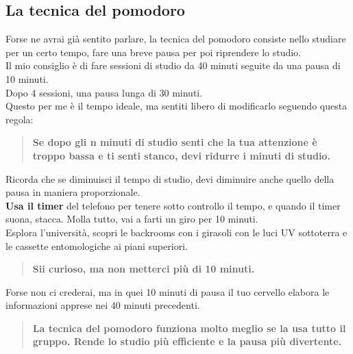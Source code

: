 \documentclass{article}
\begin{document}
\subsection{La tecnica del pomodoro}
Forse ne avrai già sentito parlare, la tecnica del pomodoro consiste nello studiare per un certo tempo, fare una breve pausa per poi riprendere lo studio.\\
Il mio consiglio è di fare sessioni di studio da 40 minuti seguite da una pausa di 10 minuti.\\
Dopo 4 sessioni, una pausa lunga di 30 minuti.\\
Questo per me è il tempo ideale, ma sentiti libero di modificarlo seguendo questa regola:
\begin{quote}
\textbf{Se dopo gli n minuti di studio senti che la tua attenzione è troppo bassa e ti senti stanco, devi ridurre i minuti di studio.}
\end{quote}
Ricorda che se diminuisci il tempo di studio, devi diminuire anche quello della pausa in maniera proporzionale.\\
\textbf{Usa il timer} del telefono per tenere sotto controllo il tempo, e quando il timer suona, stacca. Molla tutto, vai a farti un giro per 10 minuti.\\
Esplora l'università, scopri le backrooms con i girasoli con le luci UV sottoterra e le cassette entomologiche ai piani superiori.
\begin{quote}
\textbf{Sii curioso, ma non metterci più di 10 minuti.}
\end{quote}
Forse non ci crederai, ma in quei 10 minuti di pausa il tuo cervello elabora le informazioni apprese nei 40 minuti precedenti.
\begin{quote}
\textbf{La tecnica del pomodoro funziona molto meglio se la usa tutto il gruppo. Rende lo studio più efficiente e la pausa più divertente.}
\end{quote}%
\end{document}
